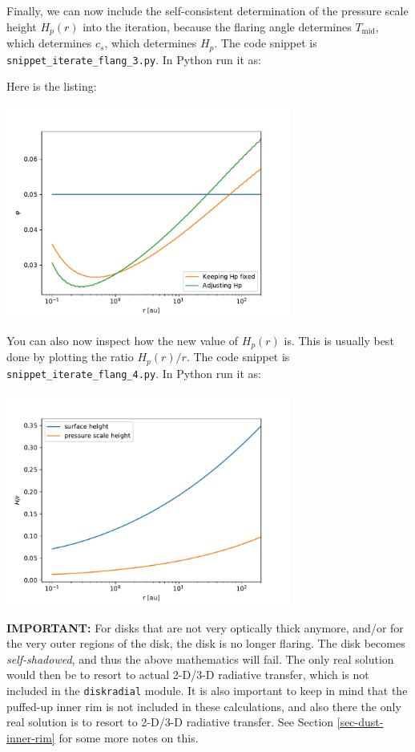 \documentclass{book}
\newcommand{\code}[1]{{\small\tt #1}}
\begin{document}
Finally, we can now include the self-consistent determination of the
pressure scale height $H_p(r)$ into the iteration, because the flaring angle
determines $T_{\mathrm{mid}}$, which determines $c_s$, which determines
$H_p$. The code snippet is
\code{snippet\_iterate\_flang\_3.py}. In Python run it as:
\begin{codebox}
\end{codebox}
Here is the listing:

\centerline{\includegraphics[width=0.7\textwidth]{../snippets/fig_snippet_iterate_flang_3_1.pdf}}
You can also now inspect how the new value of $H_p(r)$ is. This is usually
best done by plotting the ratio $H_p(r)/r$. The code snippet is
\code{snippet\_iterate\_flang\_4.py}. In Python run it as:
\begin{codebox}
\end{codebox}
\centerline{\includegraphics[width=0.7\textwidth]{../snippets/fig_snippet_iterate_flang_4_1.pdf}}

{\bf IMPORTANT:} For disks that are not very optically thick anymore, and/or for
the very outer regions of the disk, the disk is no longer flaring. The disk
becomes {\em self-shadowed}, and thus the above mathematics will fail.  The only
real solution would then be to resort to actual 2-D/3-D radiative transfer,
which is not included in the \code{diskradial} module. It is also important to
keep in mind that the puffed-up inner rim is not included in these calculations,
and also there the only real solution is to resort to 2-D/3-D radiative
transfer. See Section \ref{sec-dust-inner-rim} for some more notes on this.
\end{document}
